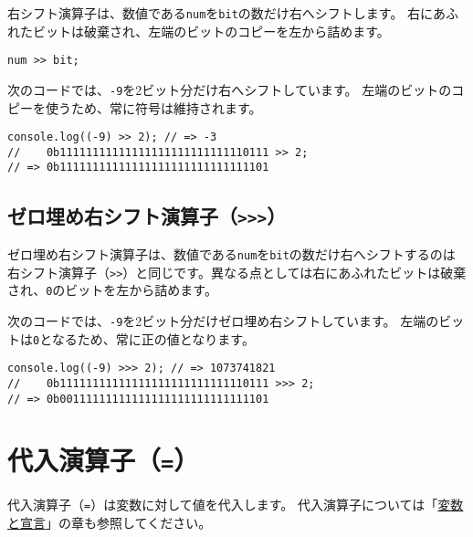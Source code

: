右シフト演算子は、数値である\texttt{num}を\texttt{bit}の数だけ右へシフトします。
右にあふれたビットは破棄され、左端のビットのコピーを左から詰めます。

\begin{lstlisting}
num >> bit;
\end{lstlisting}

次のコードでは、\texttt{-9}を2ビット分だけ右へシフトしています。
左端のビットのコピーを使うため、常に符号は維持されます。

\begin{lstlisting}
console.log((-9) >> 2); // => -3
//    0b11111111111111111111111111110111 >> 2;
// => 0b11111111111111111111111111111101
\end{lstlisting}

\hypertarget{fill-zero-right-shift}{%
\subsection{\texorpdfstring{ゼロ埋め右シフト演算子（\texttt{\textgreater{}\textgreater{}\textgreater{}}）}{ゼロ埋め右シフト演算子（\textgreater{}\textgreater{}\textgreater{}）}}\label{fill-zero-right-shift}}

ゼロ埋め右シフト演算子は、数値である\texttt{num}を\texttt{bit}の数だけ右へシフトするのは右シフト演算子（\lstinline{>>}）と同じです。異なる点としては右にあふれたビットは破棄され、\texttt{0}のビットを左から詰めます。

次のコードでは、\texttt{-9}を2ビット分だけゼロ埋め右シフトしています。
左端のビットは\texttt{0}となるため、常に正の値となります。

\begin{lstlisting}
console.log((-9) >>> 2); // => 1073741821
//    0b11111111111111111111111111110111 >>> 2;
// => 0b00111111111111111111111111111101
\end{lstlisting}

\hypertarget{assignment-operator}{%
\section{\texorpdfstring{代入演算子（\texttt{=}）}{代入演算子（=）}}\label{assignment-operator}}

代入演算子（\texttt{=}）は変数に対して値を代入します。
代入演算子については「\hyperlink{variable-and-declaration}{変数と宣言}」の章も参照してください。


